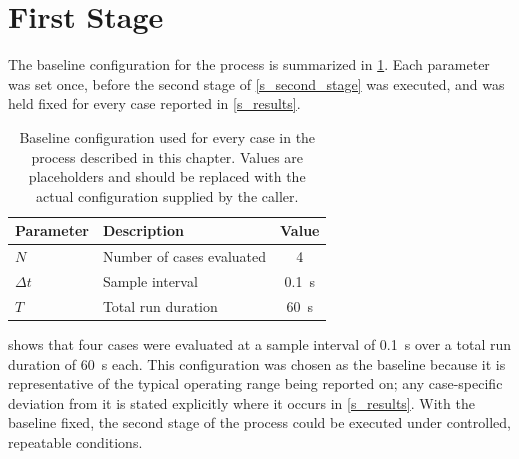 \section{First Stage}%
\label{s_first_stage}

The baseline configuration for the process is summarized in
\cref{tab:baseline_config}. Each parameter was set once, before the
second stage of \cref{s_second_stage} was executed, and was held fixed
for every case reported in \cref{s_results}.

\begin{table}[!htb]
\centering
\caption{Baseline configuration used for every case in the process
described in this chapter. Values are placeholders and should be
replaced with the actual configuration supplied by the caller.}
\label{tab:baseline_config}
\begin{tabular}{@{}llc@{}}
\toprule
Parameter & Description & Value \\
\midrule
$N$ & Number of cases evaluated & 4 \\
$\Delta t$ & Sample interval & \SI{0.1}{\second} \\
$T$ & Total run duration & \SI{60}{\second} \\
\bottomrule
\end{tabular}
\end{table}

 shows that four cases were evaluated at a
sample interval of \SI{0.1}{\second} over a total run duration of
\SI{60}{\second} each. This configuration was chosen as the baseline
because it is representative of the typical operating range being
reported on; any case-specific deviation from it is stated explicitly
where it occurs in \cref{s_results}. With the baseline fixed, the second
stage of the process could be executed under controlled, repeatable
conditions.

